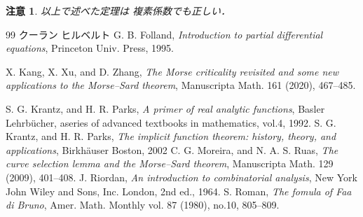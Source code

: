 \documentclass[leqno, a4paper, 12pt]{jsarticle}
\newtheorem*{rmk}{注意}
\begin{document}
\begin{rmk}
 以上で述べた定理は
 複素係数でも正しい．
\end{rmk}

\begin{thebibliography}{99}
クーラン ヒルベルト 
G. B. Folland, 
\textit{
Introduction to partial differential 
equations},
Princeton Univ. Press, 1995.  

X. Kang, X. Xu, and D. Zhang, 
\textit{The Morse criticality revisited and some new applications to the Morse--Sard theorem}, 
Manuscripta Math. 161 (2020), 467--485. 

S. G. Krantz, and 
H. R. Parks, 
\textit{A primer of real analytic functions}, 
Basler Lehrb\"{u}cher, aseries of advanced textbooks in mathematics, vol.4, 
1992. 
S. G. Krantz, and 
H. R. Parks, 
\textit{The implicit function theorem: history, theory, and applications}, 
Birkh\"auser Boston, 
2002
C. G. Moreira, and N. A. S. Ruas, 
\textit{The curve selection lemma and the Morse--Sard theorem}, 
Manuscripta Math. 129 (2009), 401--408. 
J. Riordan, \textit{An introduction to 
combinatorial analysis}, 
New York John Wiley and Sons, Inc. London, 2nd ed., 1964. 
S. Roman, 
\textit{The fomula of Faa di Bruno}, 
Amer. Math. Monthly vol. 87 (1980), no.10, 805--809. 
\end{thebibliography}




			
\end{document}
